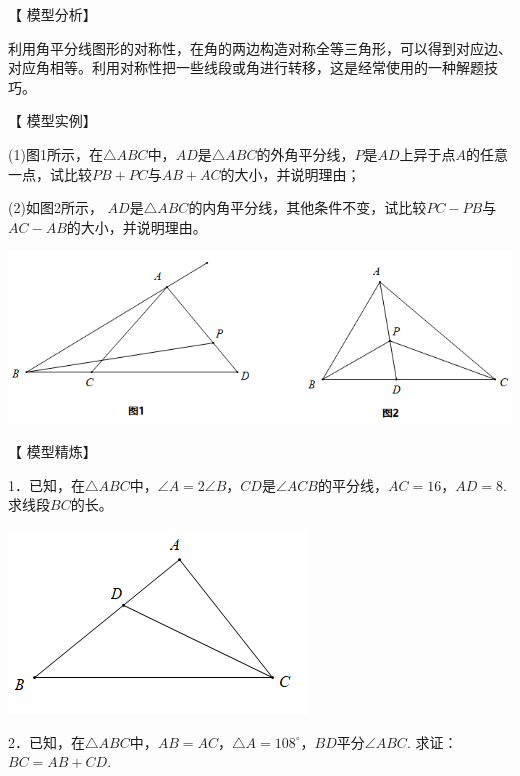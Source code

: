 \documentclass[10pt]{ctexart}
\begin{document}
【 {\heiti 模型分析}】

利用角平分线图形的对称性，在角的两边构造对称全等三角形，可以得到对应边、对应角相等。利用对称性把一些线段或角进行转移，这是经常使用的一种解题技巧。

【 {\heiti 模型实例}】
\begin{shaded}
(1)图1所示，在$\triangle ABC$中，$AD$是$\triangle ABC$的外角平分线，$P$是$AD$上异于点$A$的任意一点，试比较$PB+PC$与$AB+AC$的大小，并说明理由；

(2)如图2所示， $AD$是$\triangle ABC$的内角平分线，其他条件不变，试比较$PC-PB$与$AC-AB$的大小，并说明理由。
\end{shaded}

\begin{center}
	\includegraphics[scale=0.6]{figure/jiaopfxian12}
\end{center}

【 {\heiti 模型精炼}】

\begin{shaded}
1．已知，在$\triangle ABC$中，$\angle A=2\angle B$，$CD$是$\angle ACB$的平分线，$AC=16$，$AD=8$. 求线段$BC$的长。
\end{shaded}

\begin{flushright}
	\includegraphics[scale=0.6]{figure/jiaopfxian13}
\end{flushright}

\begin{shaded}
2．已知，在$\triangle ABC$中，$AB=AC$，$\triangle A=108^\circ$，$BD$平分$\angle ABC$. 求证：$BC=AB+CD$.
\end{shaded}
\end{document}
